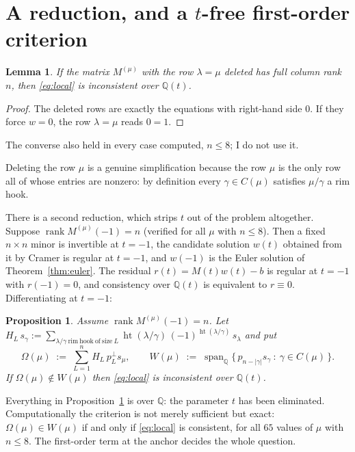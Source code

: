\documentclass[11pt]{article}
\newtheorem{proposition}[theorem]{Proposition}
\newtheorem{lemma}[theorem]{Lemma}
\theoremstyle{definition}
\newcommand{\Q}{\mathbb{Q}}
\newcommand{\hgt}{\operatorname{ht}}      %
\begin{document}
\section{A reduction, and a $t$-free first-order criterion}\label{sec:reduce}

\begin{lemma}\label{lem:deleterow}
If the matrix $M^{(\mu)}$ with the row $\lambda=\mu$ deleted has full column rank $n$, then
\eqref{eq:local} is inconsistent over $\Q(t)$.
\end{lemma}

\begin{proof}
The deleted rows are exactly the equations with right-hand side $0$. If they force $w=0$,
the row $\lambda=\mu$ reads $0=1$.
\end{proof}

The converse also held in every case computed, $n\le8$; I do not use it.

Deleting the row $\mu$ is a genuine simplification because the row $\mu$ is the only row all
of whose entries are nonzero: by definition every $\gamma\in C(\mu)$ satisfies
$\mu/\gamma$ a rim hook.

There is a second reduction, which strips $t$ out of the problem altogether. Suppose
$\operatorname{rank}M^{(\mu)}(-1)=n$ (verified for all $\mu$ with $n\le8$). Then a fixed
$n\times n$ minor is invertible at $t=-1$, the candidate solution $w(t)$ obtained from it by
Cramer is regular at $t=-1$, and $w(-1)$ is the Euler solution of Theorem~\ref{thm:euler}.
The residual $r(t)=M(t)w(t)-b$ is regular at $t=-1$ with $r(-1)=0$, and consistency over
$\Q(t)$ is equivalent to $r\equiv0$. Differentiating at $t=-1$:

\begin{proposition}\label{prop:firstorder}
Assume $\operatorname{rank}M^{(\mu)}(-1)=n$. Let
$H_L\,s_\gamma:=\sum_{\lambda/\gamma\ \mathrm{rim\ hook\ of\ size}\ L}
   \hgt(\lambda/\gamma)\,(-1)^{\hgt(\lambda/\gamma)}\,s_\lambda$
and put
\[
  \Omega(\mu)\;:=\;\sum_{L=1}^{n} H_L\,p_L^{\perp}s_\mu,
  \qquad
  W(\mu)\;:=\;\operatorname{span}_{\Q}\{\,p_{n-|\gamma|}s_\gamma\ :\ \gamma\in C(\mu)\,\}.
\]
If $\Omega(\mu)\notin W(\mu)$ then \eqref{eq:local} is inconsistent over $\Q(t)$.
\end{proposition}

Everything in Proposition~\ref{prop:firstorder} is over $\Q$: the parameter $t$ has been
eliminated. Computationally the criterion is not merely sufficient but exact:
$\Omega(\mu)\in W(\mu)$ if and only if \eqref{eq:local} is consistent, for all $65$ values of
$\mu$ with $n\le8$. The first-order term at the anchor decides the whole question.
\end{document}
